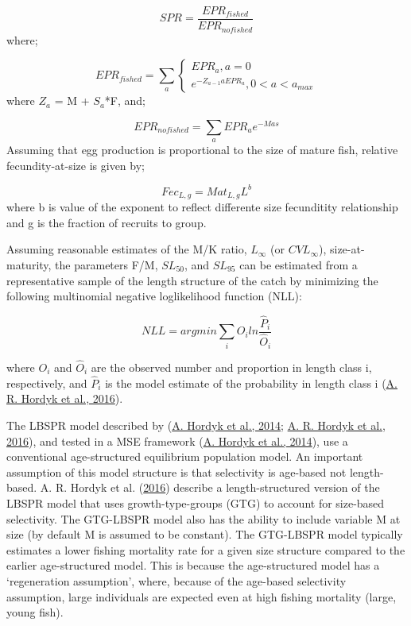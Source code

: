 \documentclass[
]{article}
\begin{document}
\[{SPR}=\frac{EPR_{fished}}{EPR_{nofished}}\] where;

\[
EPR_{fished} =
\sum_{a}
\begin{cases}
 EPR_{a},  a = 0  \\
 e^{-Z_{{a-1}}a EPR_a}, 0 < a  < a_{max}
 \end{cases}       
\] where \(Z_a\) = M + \(S_a\)*F, and;

\[
EPR_{nofished} =
\sum_{a}
 EPR_ae^{-Mas}
\] Assuming that egg production is proportional to the size of mature
fish, relative fecundity-at-size is given by;

\[
Fec_{L,g} = Mat_{L,g} L^b
\] where b is value of the exponent to reflect differente size
fecunditity relationship and g is the fraction of recruits to group.

Assuming reasonable estimates of the M/K ratio, \(L_{\infty}\) (or
\(CVL_{\infty}\)), size-at-maturity, the parameters F/M, \(SL_{50}\),
and \(SL_{95}\) can be estimated from a representative sample of the
length structure of the catch by minimizing the following multinomial
negative loglikelihood function (NLL):

\[
NLL =
argmin\sum_{i}
 O_i ln\frac{\hat{P}_i}{\hat{O}_i}
\]

where \(O_i\) and \(\hat{O}_i\) are the observed number and proportion
in length class i, respectively, and \(\hat{P}_i\) is the model estimate
of the probability in length class i
(\protect\hyperlink{ref-Hordyk2016}{A. R. Hordyk et al., 2016}).

The LBSPR model described by (\protect\hyperlink{ref-Hordyk2014c}{A.
Hordyk et al., 2014}; \protect\hyperlink{ref-Hordyk2016}{A. R. Hordyk et
al., 2016}), and tested in a MSE framework
(\protect\hyperlink{ref-Hordyk2014c}{A. Hordyk et al., 2014}), use a
conventional age-structured equilibrium population model. An important
assumption of this model structure is that selectivity is age-based not
length-based. A. R. Hordyk et al.
(\protect\hyperlink{ref-Hordyk2016}{2016}) describe a length-structured
version of the LBSPR model that uses growth-type-groups (GTG) to account
for size-based selectivity. The GTG-LBSPR model also has the ability to
include variable M at size (by default M is assumed to be constant). The
GTG-LBSPR model typically estimates a lower fishing mortality rate for a
given size structure compared to the earlier age-structured model. This
is because the age-structured model has a `regeneration assumption',
where, because of the age-based selectivity assumption, large
individuals are expected even at high fishing mortality (large, young
fish).
\end{document}
